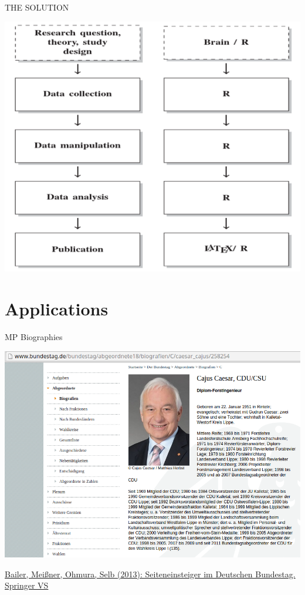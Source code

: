 \documentclass[ignorenonframetext,]{beamer}
\begin{document}
\begin{frame}{THE SOLUTION}

\includegraphics{fig/solution.png}

\end{frame}

\section{Applications}\label{applications}

\begin{frame}{MP Biographies}

\includegraphics{fig/politicalcareers.png}

\href{http://www.springer.com/us/book/9783658010256}{Bailer, Meißner,
Ohmura, Selb (2013): Seiteneinsteiger im Deutschen Bundestag. Springer
VS}

\end{frame}
\end{document}
